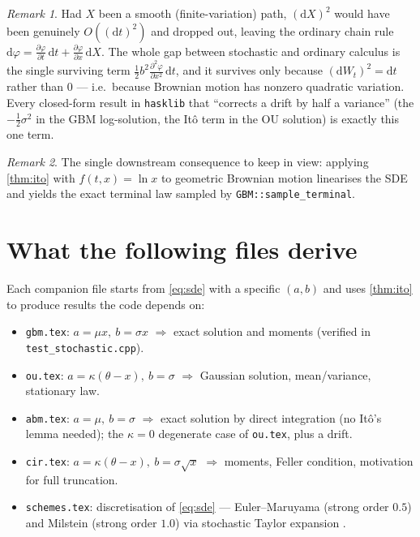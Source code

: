 \documentclass[11pt]{article}
\newcommand{\dd}{\mathrm{d}}           %
\newcommand{\dW}{\dd W_t}              %
\newcommand{\dt}{\dd t}                %
\newcommand{\drift}{a}                 %
\newcommand{\diff}{b}                  %
\theoremstyle{plain}
\theoremstyle{definition}
\theoremstyle{remark}
\newtheorem{remark}{Remark}
\begin{document}
\begin{remark}
Had $X$ been a smooth (finite-variation) path, $(\dd X)^2$ would have been
genuinely $O((\dt)^2)$ and dropped out, leaving the ordinary chain rule
$\dd \varphi = \frac{\partial\varphi}{\partial t}\,\dt + \frac{\partial\varphi}{\partial x}\,\dd X$. The whole gap between stochastic and ordinary
calculus is the single surviving term $\tfrac12\diff^2 \frac{\partial^2\varphi}{\partial x^2}\,\dt$, and it
survives only because $(\dW)^2=\dt$ rather than $0$ --- i.e.\ because Brownian
motion has nonzero quadratic variation. Every closed-form result in
\texttt{hasklib} that ``corrects a drift by half a variance'' (the
$-\tfrac12\sigma^2$ in the GBM log-solution, the It\^o term in the OU solution)
is exactly this one term.
\end{remark}

\begin{remark}
The single downstream consequence to keep in view: applying
\cref{thm:ito} with $f(t,x)=\ln x$ to geometric Brownian motion
linearises the SDE and yields the exact terminal law sampled by
\texttt{GBM::sample\_terminal}.
\end{remark}

\section{What the following files derive}

Each companion file starts from \eqref{eq:sde} with a specific
$(\drift,\diff)$ and uses \cref{thm:ito} to produce results the code
depends on:
\begin{itemize}
  \item \texttt{gbm.tex}: $\drift=\mu x,\ \diff=\sigma x$ $\Rightarrow$
        exact solution and moments (verified in
        \texttt{test\_stochastic.cpp}).
  \item \texttt{ou.tex}: $\drift=\kappa(\theta-x),\ \diff=\sigma$
        $\Rightarrow$ Gaussian solution, mean/variance, stationary law.
  \item \texttt{abm.tex}: $\drift=\mu,\ \diff=\sigma$ $\Rightarrow$
        exact solution by direct integration (no It\^o's lemma needed);
        the $\kappa=0$ degenerate case of \texttt{ou.tex}, plus a
        drift.
  \item \texttt{cir.tex}: $\drift=\kappa(\theta-x),\ \diff=\sigma\sqrt{x}$
        $\Rightarrow$ moments, Feller condition, motivation for full
        truncation.
  \item \texttt{schemes.tex}: discretisation of \eqref{eq:sde} ---
        Euler--Maruyama (strong order $0.5$) and Milstein
        (strong order $1.0$) via stochastic Taylor expansion
        \cite{kloeden1992}.
\end{itemize}



\end{document}

